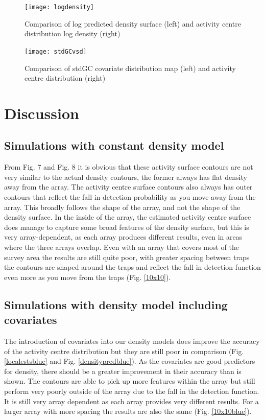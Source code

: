 \documentclass[a4paper,12pt]{article}
\begin{document}
\begin{figure}[H]
\centering
\texttt{[image: logdensity]}
\caption{Comparison of log predicted density surface (left) and activity centre distribution log density (right)}
\label{tostlogdensity}
\end{figure}

\begin{figure}[H]
\centering
\texttt{[image: stdGCvsd]}
\caption{Comparison of stdGC covariate distribution map (left) and activity centre distribution (right)}
\label{stdGCvsd}
\end{figure}


\section{Discussion}
\subsection{Simulations with constant density model}
From Fig. 7 and Fig. 8 it is obvious that these activity surface contours are not very similar to the actual density contours, the former always has flat density away from the array. The activity centre surface contours also always has outer contours that reflect the fall in detection probability as you move away from the array. This broadly follows the shape of the array, and not the shape of the density surface. In the inside of the array, the estimated activity centre surface does manage to capture some broad features of the density surface, but this is very array-dependent, as each array produces different results, even in areas where the three arrays overlap.
Even with an array that covers most of the survey area the results are still quite poor, with greater spacing between traps the contours are shaped around the traps and reflect the fall in detection function even more as you move from the traps (Fig. \ref{10x10}).
\subsection{Simulations with density model including covariates}
The introduction of covariates into our density models does improve the accuracy of the activity centre distribution but they are still poor in comparison (Fig. \ref{localestsblue} and Fig. \ref{densitypredblue}). As the covariates are good predictors for density, there should be a greater improvement in their accuracy than is shown. The contours are able to pick up more features within the array but still perform very poorly outside of the array due to the fall in the detection function. It is still very array dependent as each array provides very different results. For a larger array with more spacing the results are also the same (Fig. \ref{10x10blue}).
\end{document}
